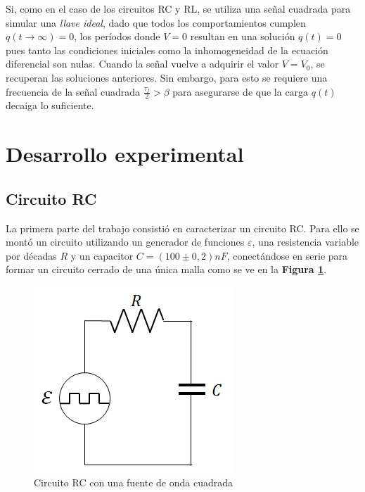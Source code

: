 \documentclass[11pt,a4paper]{article}
\begin{document}
Si, como en el caso de los circuitos RC y RL, se utiliza una señal cuadrada para simular una \textit{llave ideal}, dado que todos los comportamientos cumplen $q(t\rightarrow\infty) = 0$, los períodos donde $V = 0$ resultan en una solución $q(t) = 0$ pues tanto las condiciones iniciales como la inhomogeneidad de la ecuación diferencial son nulas. Cuando la señal vuelve a adquirir el valor $V = V_0$, se recuperan las soluciones anteriores. Sin embargo, para esto se requiere una frecuencia de la señal cuadrada $\frac{\tau_f}{2} > \beta$ para asegurarse de que la carga $q(t)$ decaiga lo suficiente. 



\section{Desarrollo experimental}

\subsection{Circuito RC}

La primera parte del trabajo consistió en caracterizar un circuito RC. Para ello se montó un circuito utilizando un generador de funciones $\varepsilon$, una resistencia variable por décadas $R$ y un capacitor $C = (100 \pm 0,2)nF$, conectándose en serie para formar un circuito cerrado de una única malla como se ve en la \textbf{Figura \ref{fig:RC}}. 

\begin{figure}[h]
\centering
  \includegraphics[scale=0.7]{Circuito-RC}
  \caption{Circuito RC con una fuente de onda cuadrada}
  \label{fig:RC}
\end{figure}
\end{document}
